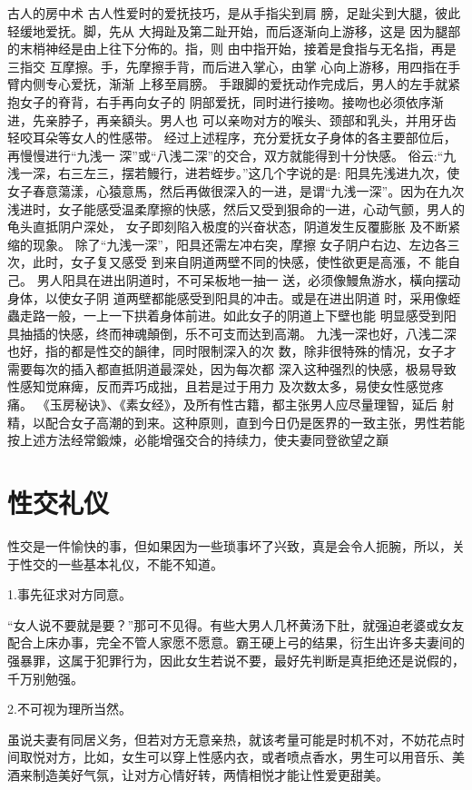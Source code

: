\documentclass[12pt,UTF8]{ctexbook}
\begin{document}
古人的房中术
古人性爱时的爱抚技巧，是从手指尖到肩
膀，足趾尖到大腿，彼此轻缓地爱抚。脚，先从
大拇趾及第二趾开始，而后逐渐向上游移，这是
因为腿部的末梢神经是由上往下分佈的。指，则
由中指开始，接着是食指与无名指，再是三指交
互摩擦。手，先摩擦手背，而后进入掌心，由掌
心向上游移，用四指在手臂内侧专心爱抚，渐渐
上移至肩膀。
手跟脚的爱抚动作完成后，男人的左手就紧抱女子的脊背，右手再向女子的
阴部爱抚，同时进行接吻。接吻也必须依序渐进，先亲脖子，再亲額头。男人也
可以亲吻对方的喉头、颈部和乳头，并用牙齿轻咬耳朵等女人的性感带。
经过上述程序，充分爱抚女子身体的各主要部位后，再慢慢进行“九浅一
深”或“八浅二深”的交合，双方就能得到十分快感。
俗云:“九浅一深，右三左三，摆若鰻行，进若蛭步。”这几个字说的是:
阳具先浅进九次，使女子春意蕩漾，心猿意馬，然后再做很深入的一进，是谓“九浅一深”。因为在九次浅进时，女子能感受温柔摩擦的快感，然后又受到狠命的一进，心动气颤，男人的龟头直抵阴户深处，
女子即刻陷入极度的兴奋状态，阴道发生反覆膨胀
及不断紧缩的现象。
除了“九浅一深”，阳具还需左冲右突，摩擦
女子阴户右边、左边各三次，此时，女子复又感受
到来自阴道两壁不同的快感，使性欲更是高漲，不
能自己。
男人阳具在进出阴道时，不可呆板地一抽一
送，必须像鰻魚游水，橫向摆动身体，以使女子阴
道两壁都能感受到阳具的冲击。或是在进出阴道
时，采用像蛭蟲走路一般，一上一下拱着身体前进。如此女子的阴道上下壁也能
明显感受到阳具抽插的快感，终而神魂顛倒，乐不可支而达到高潮。
九浅一深也好，八浅二深也好，指的都是性交的韻律，同时限制深入的次
数，除非很特殊的情况，女子才需要每次的插入都直抵阴道最深处，因为每次都
深入这种强烈的快感，极易导致性感知觉麻痺，反而弄巧成拙，且若是过于用力
及次数太多，易使女性感觉疼痛。
《玉房秘诀》、《素女经》，及所有性古籍，都主张男人应尽量理智，延后
射精，以配合女子高潮的到来。这种原则，直到今日仍是医界的一致主张，男性若能按上述方法经常鍛煉，必能增强交合的持续力，使夫妻同登欲望之巔

\chapter{性交礼仪}

性交是一件愉快的事，但如果因为一些琐事坏了兴致，真是会令人扼腕，所以，关于性交的一些基本礼仪，不能不知道。

1.事先征求对方同意。

“女人说不要就是要？”那可不见得。有些大男人几杯黄汤下肚，就强迫老婆或女友配合上床办事，完全不管人家愿不愿意。霸王硬上弓的结果，衍生出许多夫妻间的强暴罪，这属于犯罪行为，因此女生若说不要，最好先判断是真拒绝还是说假的，千万别勉强。

2.不可视为理所当然。

虽说夫妻有同居义务，但若对方无意亲热，就该考量可能是时机不对，不妨花点时间取悦对方，比如，女生可以穿上性感内衣，或者喷点香水，男生可以用音乐、美酒来制造美好气氛，让对方心情好转，两情相悦才能让性爱更甜美。
\end{document}
